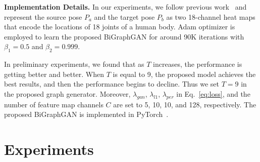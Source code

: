 \documentclass{bmvc2k}
\begin{document}
\noindent \textbf{Implementation Details.}
In our experiments, we follow previous work~\cite{zhu2019progressive,tang2020xinggan} and represent the source pose $P_a$ and the target pose $P_b$ as two 18-channel heat maps that encode the locations of 18 joints of a human body.
Adam optimizer \cite{kingma2014adam} is employed to learn the proposed BiGraphGAN for around 90K iterations with $\beta_1{=}0.5$ and $\beta_2{=}0.999$.

In preliminary experiments, we found that as $T$ increases, the performance is getting better and better. When $T$ is equal to 9, the proposed model achieves the best results, and then the performance begins to decline. Thus we set $T{=}9$ in the proposed graph generator.
Moreover, $\lambda_{gan}$, $\lambda_{l1}$, $\lambda_{per}$ in Eq.~\eqref{eq:loss}, and the number of feature map channels $C$ are set to 5, 10, 10, and 128, respectively.
The proposed BiGraphGAN is implemented in PyTorch~\cite{paszke2019pytorch}. 
 \section{Experiments}
\end{document}
